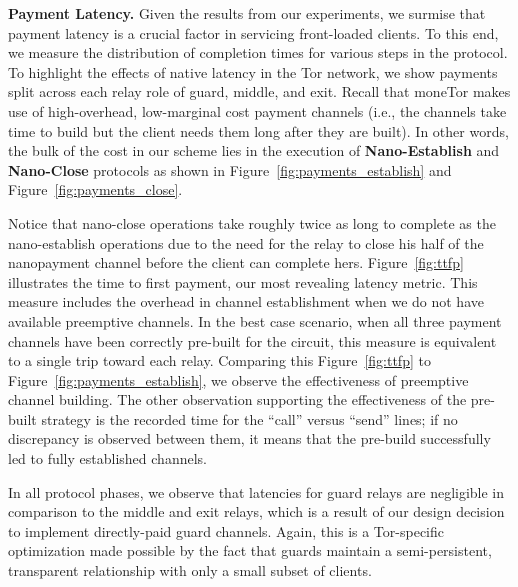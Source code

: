 \medskip \noindent \textbf{Payment Latency.}
Given the results from our experiments, we surmise that payment latency is a crucial factor in servicing front-loaded clients.
To this end, we measure the distribution of completion times for various steps in the protocol.
To highlight the effects of native latency in the Tor network, we show payments split across each relay role of guard, middle, and exit.
Recall that moneTor makes use of high-overhead, low-marginal cost payment channels (i.e., the channels take time to build but the client needs them long after they are built).
In other words, the bulk of the cost in our scheme lies in the execution of \textbf{Nano-Establish} and \textbf{Nano-Close} protocols as shown in Figure~\ref{fig:payments_establish} and Figure~\ref{fig:payments_close}.

Notice that nano-close operations take roughly twice as long to complete as the nano-establish operations due to the need for the relay to close his half of the nanopayment channel before the client can complete hers.
Figure~\ref{fig:ttfp} illustrates the time to first payment, our most revealing latency metric.
This measure includes the overhead in channel establishment when we do not have available preemptive channels.
In the best case scenario, when all three payment channels have been correctly pre-built for the circuit, this measure is equivalent to a single trip toward each relay.
Comparing this Figure~\ref{fig:ttfp} to Figure~\ref{fig:payments_establish}, we observe the effectiveness of preemptive channel building.
The other observation supporting the effectiveness of the pre-built strategy is the recorded time for the ``call'' versus ``send'' lines; if no discrepancy is observed between them, it means that the pre-build successfully led to fully established channels.

In all protocol phases, we observe that latencies for guard relays are negligible in comparison to the middle and exit relays, which is a result of our design decision to implement directly-paid guard channels.
Again, this is a Tor-specific optimization made possible by the fact that guards maintain a semi-persistent, transparent relationship with only a small subset of clients.


